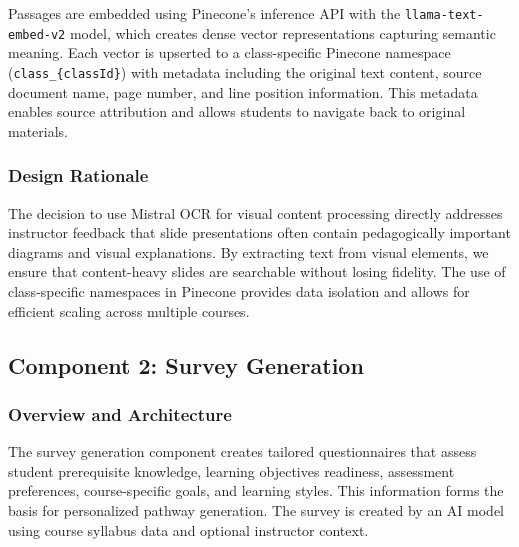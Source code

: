 \documentclass{stylefiles/capstone}
\begin{document}
Passages are embedded using Pinecone's inference API with the \texttt{llama-text-embed-v2} model, which creates dense vector representations capturing semantic meaning. Each vector is upserted to a class-specific Pinecone namespace (\texttt{class\_\{classId\}}) with metadata including the original text content, source document name, page number, and line position information. This metadata enables source attribution and allows students to navigate back to original materials.


\subsubsection{Design Rationale}

The decision to use Mistral OCR for visual content processing directly addresses instructor feedback that slide presentations often contain pedagogically important diagrams and visual explanations. By extracting text from visual elements, we ensure that content-heavy slides are searchable without losing fidelity. The use of class-specific namespaces in Pinecone provides data isolation and allows for efficient scaling across multiple courses.

\subsection{Component 2: Survey Generation}

\subsubsection{Overview and Architecture}

The survey generation component creates tailored questionnaires that assess student prerequisite knowledge, learning objectives readiness, assessment preferences, course-specific goals, and learning styles. This information forms the basis for personalized pathway generation. The survey is created by an AI model using course syllabus data and optional instructor context.
\end{document}
